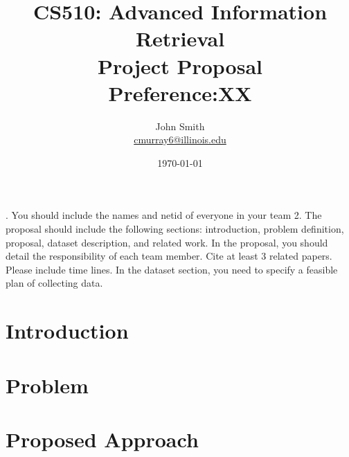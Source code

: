 \documentclass{article}
\title{\vspace{-3.0cm}CS510: Advanced Information Retrieval \\ Project Proposal \\ Preference:XX}
\author{John Smith \\
\href{mailto:cmurray6@illinois.edu}{cmurray6@illinois.edu}}
\date{\today}
\begin{document}
. You should include the names and netid of everyone in your team
2. The proposal should include the following sections: introduction, problem definition, proposal, dataset description, and related work. In the proposal, you should detail the responsibility of each team member. Cite at least 3 related papers. Please include time lines. In the dataset section, you need to specify a feasible plan of collecting data. 

\section{Introduction}

\label{introduction}

\section{Problem}

\label{problem}

\section{Proposed Approach}

\label{proposed-approach}




 
\end{document}
